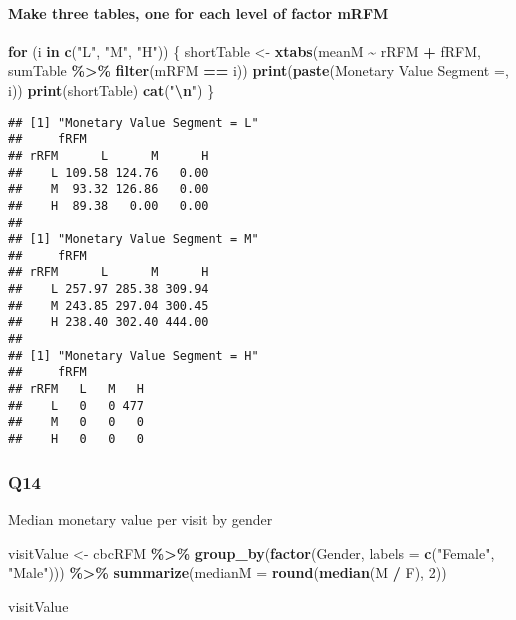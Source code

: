 \documentclass[
]{article}
\newenvironment{Shaded}{\begin{snugshade}}{\end{snugshade}}
\newcommand{\AttributeTok}[1]{\textcolor[rgb]{0.13,0.29,0.53}{#1}}
\newcommand{\ControlFlowTok}[1]{\textcolor[rgb]{0.13,0.29,0.53}{\textbf{#1}}}
\newcommand{\DecValTok}[1]{\textcolor[rgb]{0.00,0.00,0.81}{#1}}
\newcommand{\FunctionTok}[1]{\textcolor[rgb]{0.13,0.29,0.53}{\textbf{#1}}}
\newcommand{\NormalTok}[1]{#1}
\newcommand{\OtherTok}[1]{\textcolor[rgb]{0.56,0.35,0.01}{#1}}
\newcommand{\SpecialCharTok}[1]{\textcolor[rgb]{0.81,0.36,0.00}{\textbf{#1}}}
\newcommand{\StringTok}[1]{\textcolor[rgb]{0.31,0.60,0.02}{#1}}
\begin{document}
\paragraph{Make three tables, one for each level of factor
mRFM}\label{make-three-tables-one-for-each-level-of-factor-mrfm}

\begin{Shaded}
\begin{Highlighting}[]
\ControlFlowTok{for}\NormalTok{ (i }\ControlFlowTok{in} \FunctionTok{c}\NormalTok{(}\StringTok{"L"}\NormalTok{, }\StringTok{"M"}\NormalTok{, }\StringTok{"H"}\NormalTok{)) \{}
\NormalTok{  shortTable }\OtherTok{\textless{}{-}} \FunctionTok{xtabs}\NormalTok{(meanM }\SpecialCharTok{\textasciitilde{}}\NormalTok{ rRFM }\SpecialCharTok{+}\NormalTok{ fRFM, sumTable }\SpecialCharTok{\%\textgreater{}\%} \FunctionTok{filter}\NormalTok{(mRFM }\SpecialCharTok{==}\NormalTok{ i)) }
  \FunctionTok{print}\NormalTok{(}\FunctionTok{paste}\NormalTok{(}\StringTok{\textquotesingle{}Monetary Value Segment =\textquotesingle{}}\NormalTok{, i))}
  \FunctionTok{print}\NormalTok{(shortTable)}
  \FunctionTok{cat}\NormalTok{(}\StringTok{"}\SpecialCharTok{\textbackslash{}n}\StringTok{"}\NormalTok{) }
\NormalTok{\}}
\end{Highlighting}
\end{Shaded}

\begin{verbatim}
## [1] "Monetary Value Segment = L"
##     fRFM
## rRFM      L      M      H
##    L 109.58 124.76   0.00
##    M  93.32 126.86   0.00
##    H  89.38   0.00   0.00
## 
## [1] "Monetary Value Segment = M"
##     fRFM
## rRFM      L      M      H
##    L 257.97 285.38 309.94
##    M 243.85 297.04 300.45
##    H 238.40 302.40 444.00
## 
## [1] "Monetary Value Segment = H"
##     fRFM
## rRFM   L   M   H
##    L   0   0 477
##    M   0   0   0
##    H   0   0   0
\end{verbatim}

\subsubsection{Q14}\label{q14}

Median monetary value per visit by gender

\begin{Shaded}
\begin{Highlighting}[]
\NormalTok{visitValue }\OtherTok{\textless{}{-}}\NormalTok{ cbcRFM }\SpecialCharTok{\%\textgreater{}\%}
  \FunctionTok{group\_by}\NormalTok{(}\FunctionTok{factor}\NormalTok{(Gender, }\AttributeTok{labels =} \FunctionTok{c}\NormalTok{(}\StringTok{"Female"}\NormalTok{, }\StringTok{"Male"}\NormalTok{))) }\SpecialCharTok{\%\textgreater{}\%}
  \FunctionTok{summarize}\NormalTok{(}\AttributeTok{medianM =} \FunctionTok{round}\NormalTok{(}\FunctionTok{median}\NormalTok{(M }\SpecialCharTok{/}\NormalTok{ F), }\DecValTok{2}\NormalTok{))}

\NormalTok{visitValue}
\end{Highlighting}
\end{Shaded}
\end{document}
